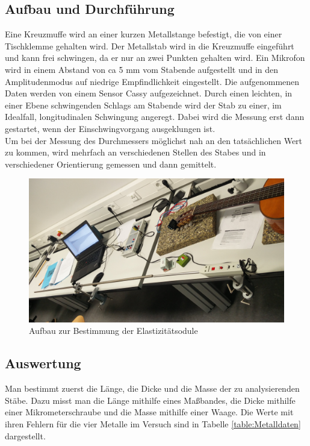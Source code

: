 \documentclass[a4paper, 11pt]{article}
\begin{document}
\subsection{Aufbau und Durchführung}
Eine Kreuzmuffe wird an einer kurzen Metallstange befestigt, die von einer Tischklemme gehalten wird. Der Metallstab wird in die Kreuzmuffe eingeführt und kann frei schwingen, da er nur an zwei Punkten gehalten wird. Ein Mikrofon wird in einem Abstand von ca 5 mm vom Stabende aufgestellt und in den Amplitudenmodus auf niedrige Empfindlichkeit eingestellt. Die aufgenommenen Daten werden von einem Sensor Cassy aufgezeichnet. 
Durch einen leichten, in einer Ebene schwingenden Schlags am Stabende wird der Stab zu einer, im Idealfall, longitudinalen Schwingung angeregt. Dabei wird die Messung erst dann gestartet, wenn der Einschwingvorgang ausgeklungen ist.
\\ Um bei der Messung des Durchmessers möglichst nah an den tatsächlichen Wert zu kommen, wird mehrfach an verschiedenen Stellen des Stabes und in verschiedener Orientierung gemessen und dann gemittelt.
\begin{figure}[H]
	\centering
	\includegraphics[scale=0.1]{../Stange.jpg}
	\caption{Aufbau zur Bestimmung der Elastizitätsodule}
	\label{fig:Aufbau zur Bestimmung der E-Module}
\end{figure}

\subsection{Auswertung}
Man bestimmt zuerst die Länge, die Dicke und die Masse der zu analysierenden Stäbe. Dazu misst man die Länge mithilfe eines Maßbandes, die Dicke mithilfe einer Mikrometerschraube und die Masse mithilfe einer Waage. Die Werte mit ihren Fehlern für die vier Metalle im Versuch sind in Tabelle \ref{table:Metalldaten} dargestellt. 
\end{document}
